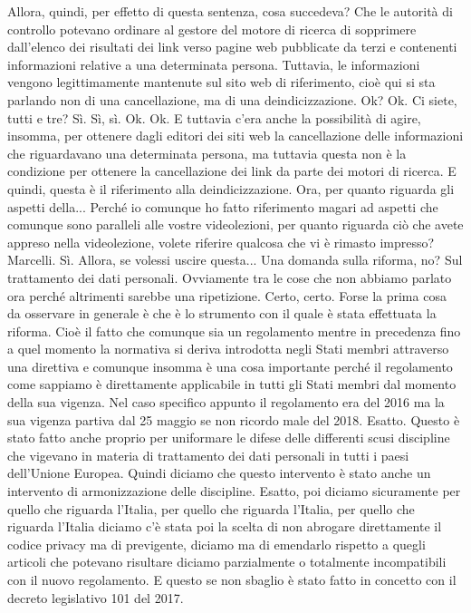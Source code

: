 Allora, quindi, per effetto di questa sentenza, cosa succedeva?
Che le autorità di controllo potevano ordinare al gestore del motore di ricerca di sopprimere dall'elenco dei risultati dei link verso pagine web pubblicate da terzi e contenenti informazioni relative a una determinata persona.
Tuttavia, le informazioni vengono legittimamente mantenute sul sito web di riferimento, cioè qui si sta parlando non di una cancellazione, ma di una deindicizzazione.
Ok?
Ok.
Ci siete, tutti e tre?
Sì.
Sì, sì.
Ok.
Ok.
E tuttavia c'era anche la possibilità di agire, insomma, per ottenere dagli editori dei siti web la cancellazione delle informazioni che riguardavano una determinata persona, ma tuttavia questa non è la condizione per ottenere la cancellazione dei link da parte dei motori di ricerca.
E quindi, questa è il riferimento alla deindicizzazione.
Ora, per quanto riguarda gli aspetti della...
Perché io comunque ho fatto riferimento magari ad aspetti che comunque sono paralleli alle vostre videolezioni, per quanto riguarda ciò che avete appreso nella videolezione, volete riferire qualcosa che vi è rimasto impresso?
Marcelli.
Sì.
Allora, se volessi uscire questa...
Una domanda sulla riforma, no?
Sul trattamento dei dati personali.
Ovviamente tra le cose che non abbiamo parlato ora perché altrimenti sarebbe una ripetizione.
Certo, certo.
Forse la prima cosa da osservare in generale è che è lo strumento con il quale è stata effettuata la riforma.
Cioè il fatto che comunque sia un regolamento mentre in precedenza fino a quel momento la normativa si deriva introdotta negli Stati membri attraverso una direttiva e comunque insomma è una cosa importante perché il regolamento come sappiamo è direttamente applicabile in tutti gli Stati membri dal momento della sua vigenza.
Nel caso specifico appunto il regolamento era del 2016 ma la sua vigenza partiva dal 25 maggio se non ricordo male del 2018.
Esatto.
Questo è stato fatto anche proprio per uniformare le difese delle differenti scusi discipline che vigevano in materia di trattamento dei dati personali in tutti i paesi dell'Unione Europea.
Quindi diciamo che questo intervento è stato anche un intervento di armonizzazione delle discipline.
Esatto, poi diciamo sicuramente per quello che riguarda l'Italia, per quello che riguarda l'Italia, per quello che riguarda l'Italia diciamo c'è stata poi la scelta di non abrogare direttamente il codice privacy ma di previgente, diciamo ma di emendarlo rispetto a quegli articoli che potevano risultare diciamo parzialmente o totalmente incompatibili con il nuovo regolamento.
E questo se non sbaglio è stato fatto in concetto con il decreto legislativo 101 del 2017.
